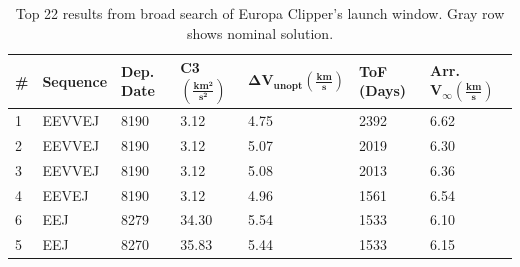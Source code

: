 \documentclass[letterpaper, preprint, paper,11pt]{AAS}	%
\begin{document}
\begin{table}[h!]
    \centering
    \caption{Top 22 results from broad search of Europa Clipper's launch window. Gray row shows nominal solution.}
    \begin{tabular}{lllllll}
        \toprule
        \textbf{\textbf{\#}}\hspace{2em} & \textbf{\textbf{Sequence}} & \textbf{Dep. Date}\footnotemark[1] & \textbf{\textbf{C3} $\boldsymbol{(\frac{km^2}{s^2})}$} & \textbf{$\boldsymbol{\Delta V_{unopt} (\frac{km}{s})}$} & \textbf{\textbf{ToF (Days) }} & \textbf{\textbf{Arr.} $\boldsymbol{V_\infty (\frac{km}{s})}$} \\
        \midrule
        1                           & EEVVEJ                     & 8190                            & 3.12                                                   & 4.75                                                    & 2392                       & 6.62                                                             \\
        2                           & EEVVEJ                     & 8190                            & 3.12                                                   & 5.07                                                    & 2019                       & 6.30                                                             \\
        3                           & EEVVEJ                     & 8190                            & 3.12                                                   & 5.08                                                    & 2013                       & 6.36                                                             \\
        4                           & EEVEJ                      & 8190                            & 3.12                                                   & 4.96                                                    & 1561                       & 6.54                                                             \\
        6                           & EEJ                        & 8279                            & 34.30                                                  & 5.54                                                    & 1533                       & 6.10                                                             \\
        5                           & EEJ                        & 8270                            & 35.83                                                  & 5.44                                                    & 1533                       & 6.15                                                             \\

\end{tabular}
\end{table}
\end{document}
